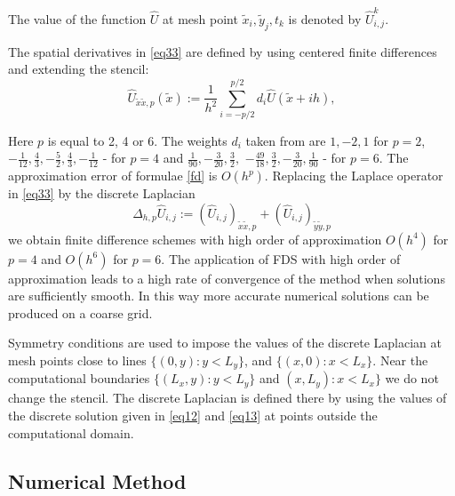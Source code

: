 \documentclass[12pt]{article}
\theoremstyle{theorem}
\theoremstyle{defi}
\begin{document}
The value of the function $\widehat U$ at mesh point $\tilde x_i,\tilde y_j,t_k$ is denoted by $\widehat U_{i,j}^k$.

\par

The spatial derivatives in \eqref{eq33} are defined by using centered finite differences
and extending the stencil:
\begin{equation}\label{fd}
\widehat U_{{\tilde x \tilde x},p}(\tilde x) :=  \frac{1}{h^2} \sum\limits_{i=-p/2}^{p/2} d_i \widehat U(\tilde x+ih),
\end{equation}

Here $p$ is equal to 2, 4 or 6.  The weights $d_i$ taken from  \cite{ref17} are
 $ 1,-2,1$ for $p=2$,
$-\frac{1}{12}, \frac{4}{3}, -\frac{5}{2}, \frac{4}{3}, -\frac{1}{12}$ - for $p=4$
 and
$\frac{1}{90}, -\frac{3}{20}, \frac{3}{2},$ $ -\frac{49}{18}, \frac{3}{2}, -\frac{3}{20}, \frac{1}{90}$ - for $p=6$. The approximation error of  formulae \eqref{fd} is $O(h^p)$. Replacing the Laplace operator in \eqref{eq33} by the discrete Laplacian
$$ \Delta_{h,p} \widehat U_{i,j} := (\widehat U_{i,j})_{{\tilde x \tilde x},p} + (\widehat U_{i,j})_{{\tilde y \tilde y},p}$$
we obtain finite difference schemes with high order of approximation $O(h^4)$ for $p=4$ and  $O(h^6)$ for $p=6 $.  The application of FDS with high order of approximation leads to a high rate of convergence of the method when solutions are sufficiently smooth. In this way more accurate numerical solutions can be produced on a coarse grid.

Symmetry conditions are used to impose the values of the discrete Laplacian at mesh points close to lines $\{(0,y) : y < L_y\}$, and $\{(x,0) : x < L_x\}$.
Near  the computational boundaries $\{(L_x,y):y<L_y\}$ and $(x,L_y):x<L_x\}$ we do not change the stencil. The discrete Laplacian
is defined  there by using the values of the discrete solution given in \eqref{eq12} and \eqref{eq13} at points outside the computational domain.

\subsection{Numerical Method}
\end{document}
